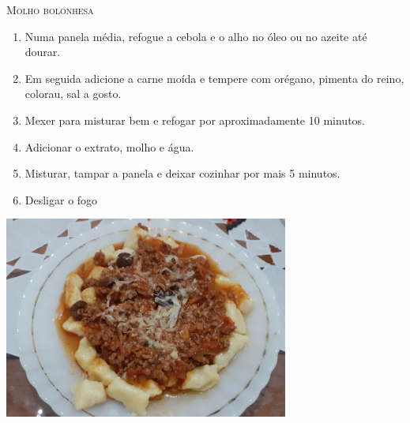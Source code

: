 {\textsc{Molho bolonhesa}
\begin{enumerate}
    \item Numa panela média, refogue a cebola e o alho no óleo ou no azeite até dourar.
    \item Em seguida adicione a carne moída e tempere com orégano, pimenta do reino, colorau, sal a gosto.
    \item Mexer para misturar bem e refogar por aproximadamente 10 minutos.
    \item Adicionar o extrato, molho e água.
    \item Misturar, tampar a panela e deixar cozinhar por mais 5 minutos.
    \item Desligar o fogo
\end{enumerate}

\begin{center}
    \includegraphics[width=0.7\textwidth]{Fotos/Nhoque.png}
\end{center}
}

